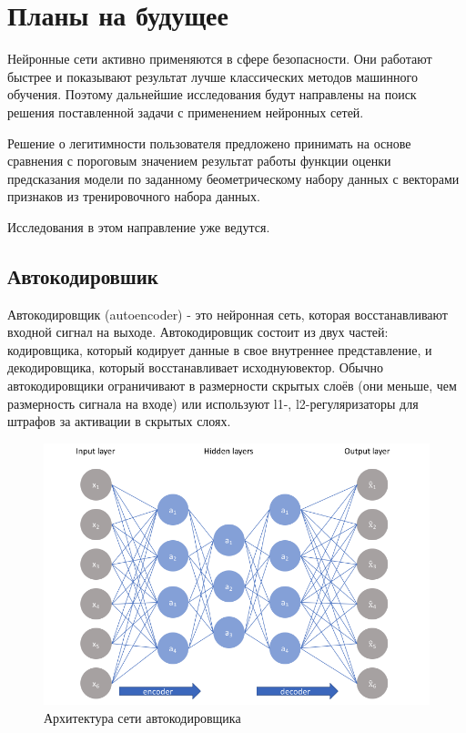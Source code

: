 \documentclass[12pt]{article}
\begin{document}
    \section{Планы на будущее}
    \label{sec:Future}

    \par Нейронные сети активно применяются в сфере безопасности. Они работают быстрее и показывают результат лучше классических методов машинного обучения. Поэтому дальнейшие исследования будут направлены на поиск решения поставленной задачи с применением нейронных сетей. \\

    \par Решение о легитимности пользователя предложено принимать на основе сравнения с пороговым значением результат работы функции оценки предсказания модели по заданному беометрическому набору данных с векторами признаков из тренировочного набора данных. \\

    \par Исследования в этом направление уже ведутся.


    \subsection{Автокодировшик}
    \label{sec:Future:Autoencoder}
    
    \par Автокодировщик (autoencoder) \cite{autoencoder} - это нейронная сеть, которая восстанавливают входной сигнал на выходе. Автокодировщик состоит из двух частей: кодировщика, который кодирует данные в свое внутреннее представление, и декодировщика, который восстанавливает исходнуювектор. Обычно автокодировщики ограничивают в размерности скрытых слоёв (они меньше, чем размерность сигнала на входе) или используют l1-, l2-регуляризаторы для штрафов за активации в скрытых слоях.

    \begin{figure}[h]
        \centering
        \includegraphics[width=0.9\linewidth]{autoencoder.png}
        \caption{Архитектура сети автокодировщика}
        \label{sec:Future:autoencoder:fig:autoencoder}
    \end{figure}
\end{document}
